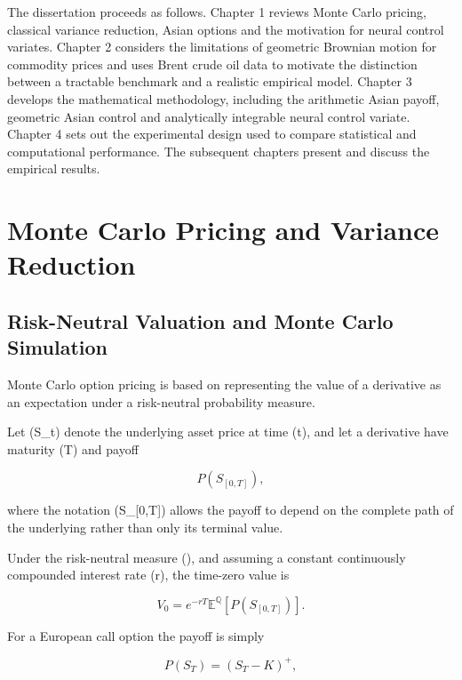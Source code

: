 \documentclass[12pt,a4paper]{report}
\begin{document}
The dissertation proceeds as follows. Chapter 1 reviews Monte Carlo pricing, classical variance reduction, Asian options and the motivation for neural control variates. Chapter 2 considers the limitations of geometric Brownian motion for commodity prices and uses Brent crude oil data to motivate the distinction between a tractable benchmark and a realistic empirical model. Chapter 3 develops the mathematical methodology, including the arithmetic Asian payoff, geometric Asian control and analytically integrable neural control variate. Chapter 4 sets out the experimental design used to compare statistical and computational performance. The subsequent chapters present and discuss the empirical results.


\chapter{Monte Carlo Pricing and Variance Reduction}

\section{Risk-Neutral Valuation and Monte Carlo Simulation}

Monte Carlo option pricing is based on representing the value of a derivative as an expectation under a risk-neutral probability measure.

Let (S_t) denote the underlying asset price at time (t), and let a derivative have maturity (T) and payoff

\begin{equation}
P(S_{[0,T]}),
\end{equation}

where the notation (S_{[0,T]}) allows the payoff to depend on the complete path of the underlying rather than only its terminal value.

Under the risk-neutral measure (), and assuming a constant continuously compounded interest rate (r), the time-zero value is

\begin{equation}
V_0
=
e^{-rT}
\mathbb{E}^{\mathbb{Q}}
\left[
P(S_{[0,T]})
\right].
\end{equation}

For a European call option the payoff is simply

\begin{equation}
P(S_T)
=
(S_T-K)^+,
\end{equation}
\end{document}
